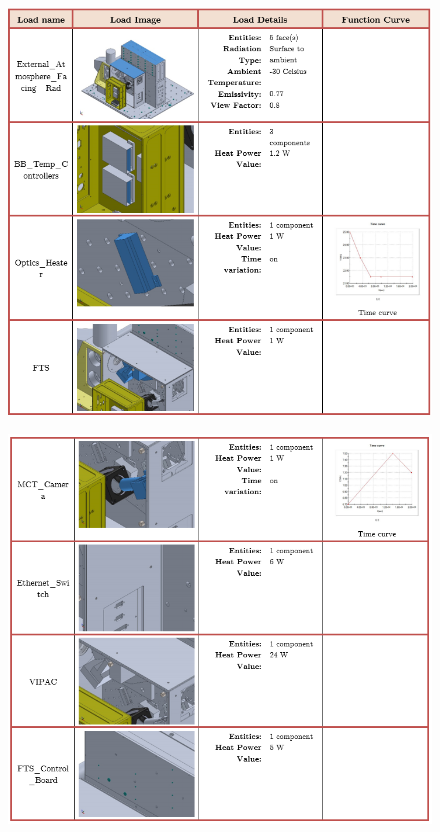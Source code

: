 \begin{figure}[h!]
    \centering
    \includegraphics[width=\textwidth]{thermal_load_images/float_TL_images/float_1.PNG}
\end{figure}

\begin{figure}
    \centering
    \includegraphics[width=\textwidth]{thermal_load_images/float_TL_images/float_2.PNG}
\end{figure}


